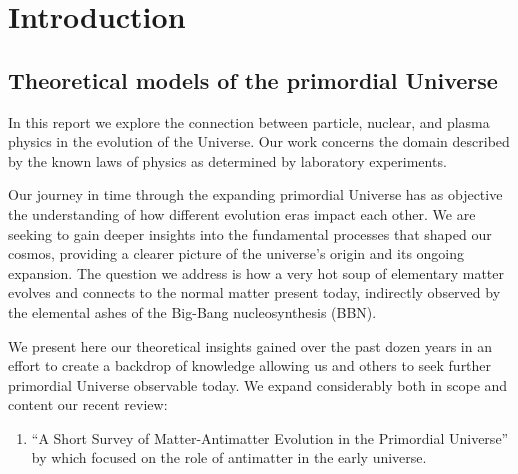 \section{Introduction}
\subsection{Theoretical models of the primordial Universe}\label{ssec:UniLab}
In this report we explore the connection between particle, nuclear, and plasma physics in the evolution of the Universe. Our work concerns the domain described by the known laws of physics as determined by laboratory experiments.

Our journey in time through the expanding primordial Universe has as objective the understanding of how different evolution eras impact each other. We are seeking to gain deeper insights into the fundamental processes that shaped our cosmos, providing a clearer picture of the universe's origin and its ongoing expansion. The question we address is how a very hot soup of elementary matter evolves and connects to the normal matter present today, indirectly observed by the elemental ashes of the Big-Bang nucleosynthesis (BBN). 

We present here our theoretical insights gained over the past dozen years in an effort to create a backdrop of knowledge allowing us and others to seek further primordial Universe observable today. We expand considerably both in scope and content our recent review:
\begin{enumerate}
\item ``A Short Survey of Matter-Antimatter Evolution in the Primordial Universe'' by  which focused on the role of antimatter in the early universe. 
\end{enumerate}

